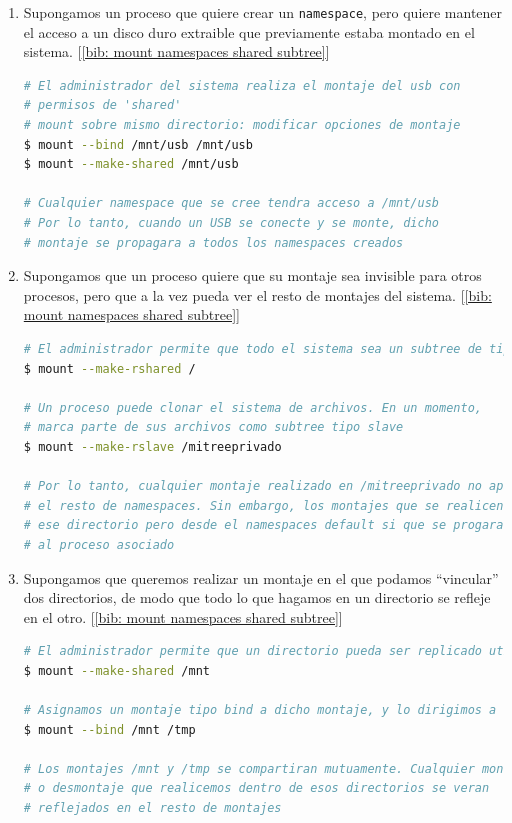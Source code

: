 \documentclass[a4paper, oneside, 12pt]{book}
\begin{document}
	\begin{enumerate}
		\item Supongamos un proceso que quiere crear un \texttt{namespace}, pero quiere mantener el acceso a un disco duro extraible que previamente estaba montado en el sistema. [\ref{bib: mount namespaces shared subtree}]
		
		\begin{lstlisting}[language=bash, caption={Caso de uso de \texttt{shared subtree}}]
# El administrador del sistema realiza el montaje del usb con 
# permisos de 'shared'
# mount sobre mismo directorio: modificar opciones de montaje
$ mount --bind /mnt/usb /mnt/usb
$ mount --make-shared /mnt/usb
			
# Cualquier namespace que se cree tendra acceso a /mnt/usb
# Por lo tanto, cuando un USB se conecte y se monte, dicho 
# montaje se propagara a todos los namespaces creados
		\end{lstlisting}
	
		\item Supongamos que un proceso quiere que su montaje sea invisible para otros procesos, pero que a la vez pueda ver el resto de montajes del sistema. [\ref{bib: mount namespaces shared subtree}]
		
		\begin{lstlisting}[language=bash, caption={Caso de uso de \texttt{slave mount}}]
# El administrador permite que todo el sistema sea un subtree de tipo shared
$ mount --make-rshared /
			
# Un proceso puede clonar el sistema de archivos. En un momento, 
# marca parte de sus archivos como subtree tipo slave
$ mount --make-rslave /mitreeprivado
			
# Por lo tanto, cualquier montaje realizado en /mitreeprivado no aparecera en 
# el resto de namespaces. Sin embargo, los montajes que se realicen en 
# ese directorio pero desde el namespaces default si que se progaran 
# al proceso asociado
		\end{lstlisting}
	
		\item Supongamos que queremos realizar un montaje en el que podamos ``vincular'' dos directorios, de modo que todo lo que hagamos en un directorio se refleje en el otro. [\ref{bib: mount namespaces shared subtree}]
		
		\begin{lstlisting}[language=bash, caption={Caso de uso de \texttt{bind} y \texttt{shared subtree}}]
# El administrador permite que un directorio pueda ser replicado utilizando el tipo shared
$ mount --make-shared /mnt

# Asignamos un montaje tipo bind a dicho montaje, y lo dirigimos a otro directorio
$ mount --bind /mnt /tmp

# Los montajes /mnt y /tmp se compartiran mutuamente. Cualquier montaje 
# o desmontaje que realicemos dentro de esos directorios se veran
# reflejados en el resto de montajes
		\end{lstlisting}

	\end{enumerate}
\end{document}
